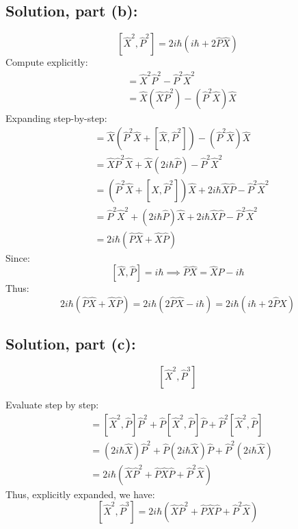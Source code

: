\documentclass[12pt]{article}
\begin{document}
    \subsection*{Solution, part (b):}
        \[
        [\hat{X}^2, \hat{P}^2] = 2i\hbar(i\hbar + 2\hat{P}\hat{X})
        \]
        Compute explicitly:
        \begin{align*}
        [\hat{X}^2, \hat{P}^2] &= \hat{X}^2\hat{P}^2 - \hat{P}^2\hat{X}^2 \\
        &= \hat{X}(\hat{X}\hat{P}^2) - (\hat{P}^2\hat{X})\hat{X}
        \end{align*}
        Expanding step-by-step:
        \begin{align*}
        &= \hat{X}(\hat{P}^2\hat{X} + [\hat{X},\hat{P}^2]) - (\hat{P}^2\hat{X})\hat{X} \\
        &= \hat{X}\hat{P}^2\hat{X} + \hat{X}(2i\hbar\hat{P}) - \hat{P}^2\hat{X}^2 \\
        &= (\hat{P}^2\hat{X} + [\hat{X},\hat{P}^2])\hat{X} + 2i\hbar\hat{X}\hat{P} - \hat{P}^2\hat{X}^2 \\
        &= \hat{P}^2\hat{X}^2 + (2i\hbar\hat{P})\hat{X} + 2i\hbar\hat{X}\hat{P} - \hat{P}^2\hat{X}^2 \\
        &= 2i\hbar(\hat{P}\hat{X}+\hat{X}\hat{P})
        \end{align*}
        Since:
        \[
        [\hat{X},\hat{P}]= i\hbar \implies \hat{P}\hat{X}=\hat{X}\hat{P}-i\hbar
        \]
        Thus:
        \[
        2i\hbar(\hat{P}\hat{X}+\hat{X}\hat{P}) = 2i\hbar(2\hat{P}\hat{X}-i\hbar)= 2i\hbar(i\hbar+2\hat{P}\hat{X})
        \]

    \subsection*{Solution, part (c):}
        \[
        [\hat{X}^2, \hat{P}^3]
        \]
        
        Evaluate step by step:
        \begin{align*}
        [\hat{X}^2, \hat{P}^3] &= [\hat{X}^2, \hat{P}]\hat{P}^2 + \hat{P}[\hat{X}^2, \hat{P}]\hat{P} + \hat{P}^2[\hat{X}^2, \hat{P}] \\
        &= (2i\hbar\hat{X})\hat{P}^2 + \hat{P}(2i\hbar\hat{X})\hat{P} + \hat{P}^2(2i\hbar\hat{X}) \\
        &= 2i\hbar(\hat{X}\hat{P}^2+\hat{P}\hat{X}\hat{P}+\hat{P}^2\hat{X})
        \end{align*}
        Thus, explicitly expanded, we have:
        \[
        [\hat{X}^2, \hat{P}^3] = 2i\hbar(\hat{X}\hat{P}^2 + \hat{P}\hat{X}\hat{P} + \hat{P}^2\hat{X})
        \]
      
\end{document}
